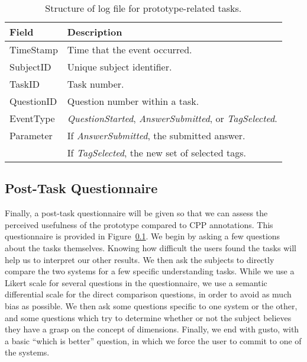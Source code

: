 \documentclass[11pt]{article}
\newcommand{\event}[1]{\textit{#1}}
\begin{document}
\begin{table}
\centering
\begin{tabular}{|l | p{}|}
\hline
\textbf{Field} & \textbf{Description} \\
\hline
TimeStamp  & Time that the event occurred. \\
SubjectID  & Unique subject identifier. \\
TaskID     & Task number. \\
QuestionID & Question number within a task. \\
EventType  & \event{QuestionStarted}, \event{AnswerSubmitted},
             or \event{TagSelected}. \\
Parameter  & If \event{AnswerSubmitted}, the submitted answer. \\
           & If \event{TagSelected}, the new set of selected tags. \\
\hline
\end{tabular}
\caption{Structure of log file for prototype-related tasks.}
\label{tbl:protolog}
\end{table}

\subsection{Post-Task Questionnaire}
\label{sec:post}

Finally, a post-task questionnaire will be given so that we can assess the
perceived usefulness of the prototype compared to CPP annotations.  This
questionnaire is provided in Figure~\ref{sec:post}.
%
We begin by asking a few questions about the tasks themselves.  Knowing how
difficult the users found the tasks will help us to interpret our other
results.  We then ask the subjects to directly compare the two systems for a
few specific understanding tasks. 
%
While we use a Likert scale for several questions in the questionnaire, we use
a semantic differential scale for the direct comparison questions, in order to
avoid as much bias as possible.  We then ask some questions specific to one
system or the other, and some questions which try to determine whether or not
the subject believes they have a grasp on the concept of dimensions.  Finally,
we end with gusto, with a basic ``which is better'' question, in which we force
the user to commit to one of the systems. 
\end{document}
